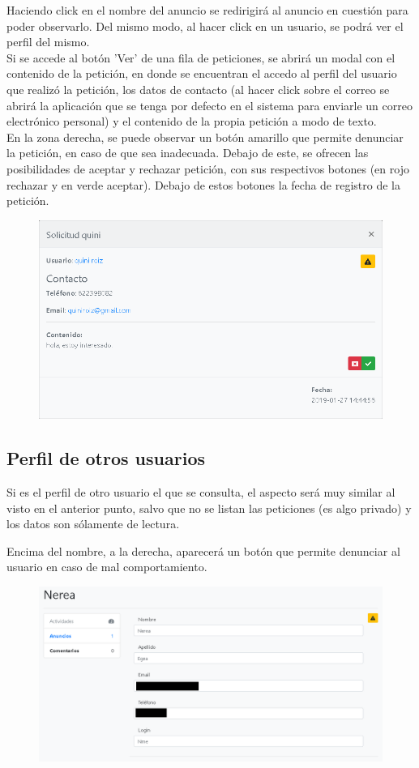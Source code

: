 Haciendo click en el nombre del anuncio se redirigir\'{a} al anuncio en cuesti\'{o}n para poder observarlo. Del mismo modo, al hacer click en un usuario, se podr\'{a} ver el perfil del mismo. \\


Si se accede al bot\'{o}n 'Ver' de una fila de peticiones, se abrir\'{a} un modal con el contenido de la petici\'{o}n, en donde se encuentran el accedo al perfil del usuario que realiz\'{o} la petici\'{o}n, los datos de contacto (al hacer click sobre el correo se abrir\'{a} la aplicaci\'{o}n que se tenga por defecto en el sistema para enviarle un correo electr\'{o}nico personal) y el contenido de la propia petici\'{o}n a modo de texto. \\

En la zona derecha, se puede observar un bot\'{o}n amarillo que permite denunciar la petici\'{o}n, en caso de que sea inadecuada. Debajo de este, se ofrecen las posibilidades de aceptar y rechazar petici\'{o}n, con sus respectivos botones (en rojo rechazar y en verde aceptar). Debajo de estos botones la fecha de registro de la petici\'{o}n.

\begin{figure}[h!]
\centering
\includegraphics[width=.6\textwidth]{Img/ManualUsuario/USER_REQUEST_READ.png}
\end{figure}

\subsection{Perfil de otros usuarios}
Si es el perfil de otro usuario el que se consulta, el aspecto ser\'{a} muy similar al visto en el anterior punto, salvo que no se listan las peticiones (es algo privado) y los datos son s\'{o}lamente de lectura. 

Encima del nombre, a la derecha, aparecer\'{a} un bot\'{o}n que permite denunciar al usuario en caso de mal comportamiento. \\

\begin{figure}[h!]
\centering
\includegraphics[width=.7\textwidth]{Img/ManualUsuario/PERFIL_OTHER.png}
\end{figure}

